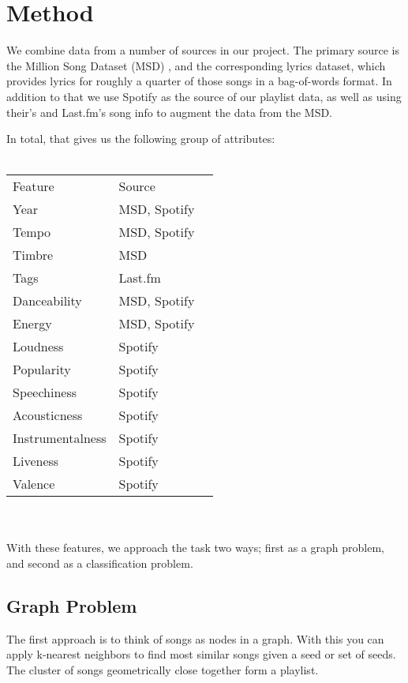 \documentclass[10pt,journal,compsoc]{IEEEtran}
\begin{document}
\section{Method}
We combine data from a number of sources in our project. The primary source is the Million Song Dataset (MSD) \cite{msd}, and the corresponding lyrics dataset, which provides lyrics for roughly a quarter of those songs in a bag-of-words format. In addition to that we use Spotify \cite{spotify} as the source of our playlist data, as well as using their's and Last.fm's \cite{lastfm} song info to augment the data from the MSD.

In total, that gives us the following group of attributes:
\\\\
\begin{tabular}{lll}
Feature           & Source          \\
Year              & MSD, Spotify    \\
Tempo             & MSD, Spotify    \\
Timbre            & MSD             \\
Tags              & Last.fm         \\
Danceability      & MSD, Spotify    \\
Energy            & MSD, Spotify    \\
Loudness          & Spotify         \\
Popularity        & Spotify         \\
Speechiness       & Spotify         \\
Acousticness      & Spotify         \\
Instrumentalness  & Spotify         \\
Liveness          & Spotify         \\
Valence           & Spotify         \\

\end{tabular}
\\\\
With these features, we approach the task two ways; first as a graph problem, and second as a classification problem.

\subsection{Graph Problem}
The first approach is to think of songs as nodes in a graph. With this you can apply k-nearest neighbors to find most similar songs given a seed or set of seeds. The cluster of songs geometrically close together form a playlist.
\end{document}
